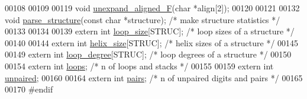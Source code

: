 \begin{DoxyCode}
00108 
00109 
00119 \textcolor{keywordtype}{void}   \hyperlink{group__struct__utils_ga1054c4477d53b31d79d4cb132100e87a}{unexpand\_aligned\_F}(\textcolor{keywordtype}{char} *align[2]);
00120 
00121 
00132 \textcolor{keywordtype}{void}   \hyperlink{group__struct__utils_ga3c79042e6bf6f01706bf30ec9e69e8ac}{parse\_structure}(\textcolor{keyword}{const} \textcolor{keywordtype}{char} *structure);  \textcolor{comment}{/* make structure statistics */}
00133 
00134 
00139 \textcolor{keyword}{extern} \textcolor{keywordtype}{int}  \hyperlink{group__struct__utils_ga3f31e0e48125601bfa57b52f8b038e8e}{loop\_size}[STRUC];         \textcolor{comment}{/* loop sizes of a structure */}
00140 
00144 \textcolor{keyword}{extern} \textcolor{keywordtype}{int}  \hyperlink{group__struct__utils_ga8218c0d581a3fba2a1a56a196abe19a5}{helix\_size}[STRUC];        \textcolor{comment}{/* helix sizes of a structure */}
00145 
00149 \textcolor{keyword}{extern} \textcolor{keywordtype}{int}  \hyperlink{group__struct__utils_gaef14e2f8ab3f61e8e659ba6b9003b08a}{loop\_degree}[STRUC];       \textcolor{comment}{/* loop degrees of a structure */}
00150 
00154 \textcolor{keyword}{extern} \textcolor{keywordtype}{int}  \hyperlink{group__struct__utils_ga439fcb9f8d4f9f4d2227fde5fbfecb30}{loops};                    \textcolor{comment}{/* n of loops and stacks */}
00155 
00159 \textcolor{keyword}{extern} \textcolor{keywordtype}{int}  \hyperlink{group__struct__utils_gadd2f952597e02d66e1116a9d11d252d6}{unpaired};
00160 
00164 \textcolor{keyword}{extern} \textcolor{keywordtype}{int}  \hyperlink{group__struct__utils_ga6341cbb704924824e0236c1dce791032}{pairs};          \textcolor{comment}{/* n of unpaired digits and pairs */}
00165 
00170 \textcolor{preprocessor}{#endif}
\end{DoxyCode}
